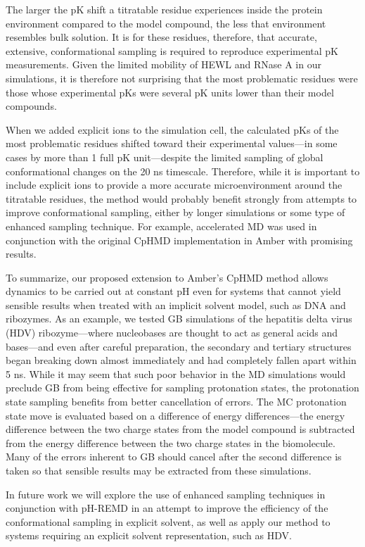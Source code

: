 The larger the pK shift a titratable residue experiences inside the
protein environment compared to the model compound, the less that environment
resembles bulk solution. It is for these residues, therefore, that accurate,
extensive, conformational sampling is required to reproduce experimental
pK measurements. Given the limited mobility of HEWL and RNase A in our
simulations, it is therefore not surprising that the most problematic residues
were those whose experimental pKs were several pK units lower than their
model compounds.

When we added explicit ions to the simulation cell, the calculated pKs of
the most problematic residues shifted toward their experimental values---in some
cases by more than 1 full pK unit---despite the limited sampling of
global conformational changes on the 20 ns timescale.  Therefore, while it is
important to include explicit ions to provide a more accurate microenvironment
around the titratable residues, the method would probably benefit strongly from
attempts to improve conformational sampling, either by longer simulations or
some type of enhanced sampling technique. For example, accelerated MD was used
in conjunction with the original CpHMD implementation in Amber with promising
results. \cite{Williams_JChemTheoryComput_2010_v6_p560}

To summarize, our proposed extension to Amber's CpHMD method allows dynamics to
be carried out at constant pH even for systems that cannot yield sensible
results when treated with an implicit solvent model, such as DNA and ribozymes.
As an example, we tested GB simulations of the hepatitis delta virus (HDV)
ribozyme---where nucleobases are thought to act as general acids and bases---and
even after careful preparation, the secondary and tertiary structures began
breaking down almost immediately and had completely fallen apart within 5 ns.
While it may seem that such poor behavior in the MD simulations would preclude
GB from being effective for sampling protonation states, the protonation state
sampling benefits from better cancellation of errors. The MC protonation state
move is evaluated based on a difference of energy differences---the energy
difference between the two charge states from the model compound is subtracted
from the energy difference between the two charge states in the biomolecule.
Many of the errors inherent to GB should cancel after the second difference is
taken so that sensible results may be extracted from these simulations.

In future work we will explore the use of enhanced sampling techniques in
conjunction with pH-REMD in an attempt to improve the efficiency of the
conformational sampling in explicit solvent, as well as apply our method to
systems requiring an explicit solvent representation, such as HDV.
